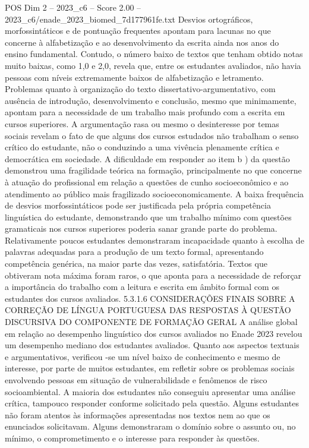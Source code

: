 \begin{textsample}{POS Dim 2 – 2023\_c6 – Score 2.00 – 2023\_c6/enade\_2023\_biomed\_7d177961fe.txt}
Desvios ortográficos, morfossintáticos e de pontuação frequentes apontam para lacunas no que concerne à alfabetização e ao desenvolvimento da escrita ainda nos anos do ensino fundamental.
Contudo, o número baixo de textos que tenham obtido notas muito baixas, como 1,0 e 2,0, revela que, entre os estudantes avaliados, não havia pessoas com níveis extremamente baixos de alfabetização e letramento.
Problemas quanto à organização do texto dissertativo-argumentativo, com ausência de introdução, desenvolvimento e conclusão, mesmo que minimamente, apontam para a necessidade de um trabalho mais profundo com a escrita em cursos superiores.
A argumentação rasa ou mesmo o desinteresse por temas sociais revelam o fato de que alguns dos cursos estudados não trabalham o senso crítico do estudante, não o conduzindo a uma vivência plenamente crítica e democrática em sociedade.
A dificuldade em responder ao item b ) da questão demonstrou uma fragilidade teórica na formação, principalmente no que concerne à atuação do profissional em relação a questões de cunho socioeconômico e ao atendimento ao público mais fragilizado socioeconomicamente.
A baixa frequência de desvios morfossintáticos pode ser justificada pela própria competência linguística do estudante, demonstrando que um trabalho mínimo com questões gramaticais nos cursos superiores poderia sanar grande parte do problema.
Relativamente poucos estudantes demonstraram incapacidade quanto à escolha de palavras adequadas para a produção de um texto formal, apresentando competência genérica, na maior parte das vezes, satisfatória.
Textos que obtiveram nota máxima foram raros, o que aponta para a necessidade de reforçar a importância do trabalho com a leitura e escrita em âmbito formal com os estudantes dos cursos avaliados. 5.3.1.6 CONSIDERAÇÕES FINAIS SOBRE A CORREÇÃO DE LÍNGUA PORTUGUESA DAS RESPOSTAS À QUESTÃO DISCURSIVA DO COMPONENTE DE FORMAÇÃO GERAL A análise global em relação ao desempenho linguístico dos cursos avaliados no Enade 2023 revelou um desempenho mediano dos estudantes avaliados.
Quanto aos aspectos textuais e argumentativos, verificou -se um nível baixo de conhecimento e mesmo de interesse, por parte de muitos estudantes, em refletir sobre os problemas sociais envolvendo pessoas em situação de vulnerabilidade e fenômenos de risco socioambiental.
A maioria dos estudantes não conseguiu apresentar uma análise crítica, tampouco responder conforme solicitado pela questão.
Alguns estudantes não foram atentos às informações apresentadas nos textos nem ao que os enunciados solicitavam.
Alguns demonstraram o domínio sobre o assunto ou, no mínimo, o comprometimento e o interesse para responder às questões.

\end{textsample}
